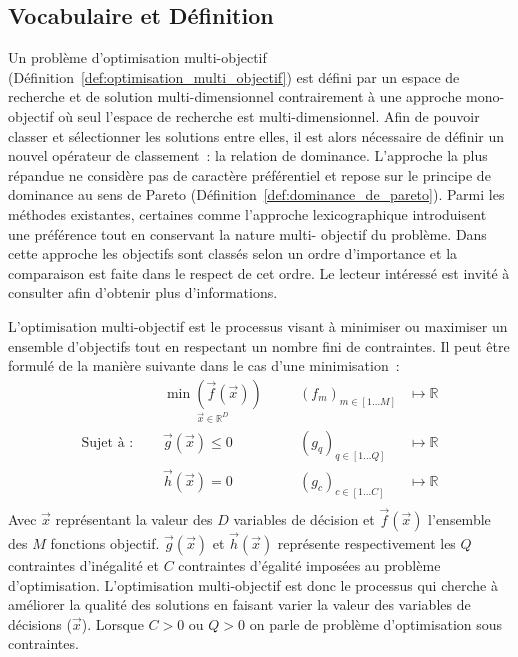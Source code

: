 \subsection{Vocabulaire et Définition} %
\label{sub:vocabulaire_et_definition}
Un problème d’optimisation multi-objectif (Définition~\ref{def:optimisation_multi_objectif})
est défini par un espace de recherche et de solution multi-dimensionnel contrairement à
une approche mono-objectif où seul l’espace de recherche est multi-dimensionnel. Afin de
pouvoir classer et sélectionner les solutions entre elles, il est alors nécessaire de
définir un nouvel opérateur de classement~: la relation de dominance. L’approche la plus
répandue ne considère pas de caractère préférentiel et repose sur le principe de dominance
au sens de Pareto (Définition~\ref{def:dominance_de_pareto}). Parmi les méthodes
existantes, certaines comme l’approche lexicographique introduisent une préférence tout en
conservant la nature multi- objectif du problème. Dans cette
approche les objectifs sont classés selon un ordre d’importance et la comparaison est
faite dans le respect de cet ordre. Le lecteur intéressé est invité à consulter
\textcite{Collette2002} afin d’obtenir plus d’informations.

\begin{Def}\label{def:optimisation_multi_objectif}
L’optimisation multi-objectif est le processus visant à minimiser ou maximiser un ensemble
d’objectifs tout en respectant un nombre fini de contraintes.
Il peut être formulé de la manière suivante dans le cas d’une minimisation~:
\begin{equation}\label{eq:def_optimisation}
  \begin{aligned}
                           & \underset{\vec{x} \in \mathbb{R}^{D}}{\min(\vec{f}(\vec{x}))}&
                           & \quad (f_{m})_{m \in [1 \dots M]} & \longmapsto \mathbb{R} \\
    \text{Sujet à~: }\quad & \vec{g}(\vec{x}) \leqslant 0                                 &
                           & \quad (g_{q})_{q \in [1 \dots Q]} & \longmapsto \mathbb{R} \\
                           & \vec{h}(\vec{x}) = 0                                         &
                           & \quad (g_{c})_{c \in [1 \dots C]} & \longmapsto \mathbb{R} \\
  \end{aligned}
\end{equation}
Avec $\vec{x}$ représentant la valeur des $D$ variables de décision et
$\vec{f}(\vec{x})$ l’ensemble des $M$ fonctions objectif.  $\vec{g}(\vec{x})$ et
$\vec{h}(\vec{x})$ représente respectivement les $Q$ contraintes d’inégalité et
$C$ contraintes d’égalité imposées au problème d’optimisation. L’optimisation
multi-objectif est donc le processus qui cherche à améliorer la qualité des
solutions en faisant varier la valeur des variables de décisions ($\vec{x}$).
Lorsque $C > 0$ ou $Q > 0$ on parle de problème d’optimisation sous contraintes.
\end{Def}

